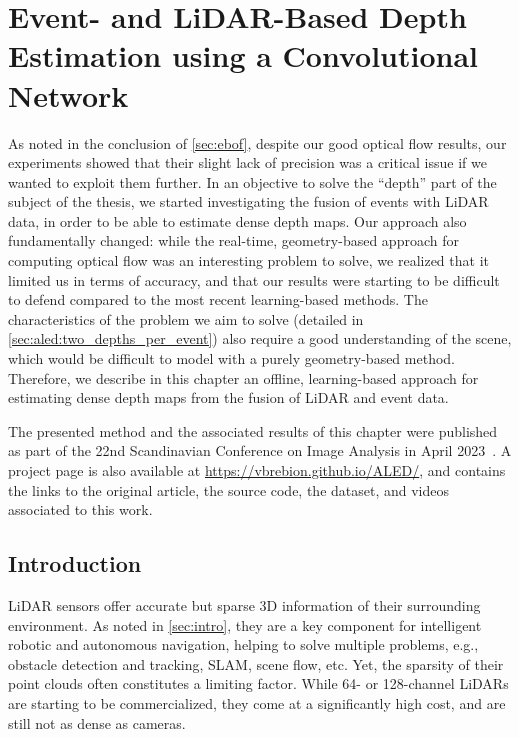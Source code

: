 \chapter{Event- and LiDAR-Based Depth Estimation using a Convolutional Network}\label{sec:aled}

As noted in the conclusion of \cref{sec:ebof}, despite our good optical flow results, our experiments showed that their slight lack of precision was a critical issue if we wanted to exploit them further. In an objective to solve the ``depth'' part of the subject of the thesis, we started investigating the fusion of events with LiDAR data, in order to be able to estimate dense depth maps. Our approach also fundamentally changed: while the real-time, geometry-based approach for computing optical flow was an interesting problem to solve, we realized that it limited us in terms of accuracy, and that our results were starting to be difficult to defend compared to the most recent learning-based methods. The characteristics of the problem we aim to solve (detailed in \cref{sec:aled:two_depths_per_event}) also require a good understanding of the scene, which would be difficult to model with a purely geometry-based method. Therefore, we describe in this chapter an offline, learning-based approach for estimating dense depth maps from the fusion of LiDAR and event data.

The presented method and the associated results of this chapter were published as part of the 22nd Scandinavian Conference on Image Analysis in April 2023~\cite{Brebion2023LearningTE}. A project page is also available at \url{https://vbrebion.github.io/ALED/}, and contains the links to the original article, the source code, the dataset, and videos associated to this work.

\section{Introduction}\label{sec:aled:intro}
LiDAR sensors offer accurate but sparse 3D information of their surrounding environment. As noted in \cref{sec:intro}, they are a key component for intelligent robotic and autonomous navigation, helping to solve multiple problems, e.g., obstacle detection and tracking, SLAM, scene flow, etc. Yet, the sparsity of their point clouds often constitutes a limiting factor. While 64- or 128-channel LiDARs are starting to be commercialized, they come at a significantly high cost, and are still not as dense as cameras.


